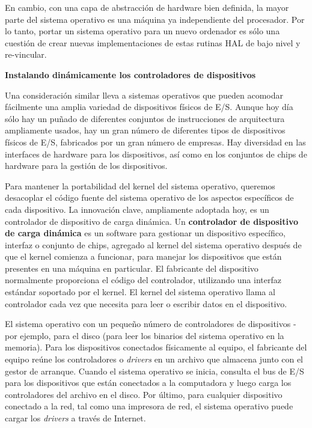 \documentclass[10pt]{book}
\begin{document}
En cambio, con una capa de abstracción de hardware bien definida, la mayor parte del sistema operativo es una máquina ya independiente del procesador. Por lo tanto, portar un sistema operativo para un nuevo ordenador es sólo una cuestión de crear nuevas implementaciones de estas rutinas HAL de bajo nivel y re-vincular.

\textbf{Instalando dinámicamente los controladores de dispositivos}

Una consideración similar lleva a sistemas operativos que pueden acomodar fácilmente una amplia variedad de dispositivos físicos de E/S. Aunque hoy día sólo hay un puñado de diferentes conjuntos de instrucciones de arquitectura ampliamente usados, hay un gran número de diferentes tipos de dispositivos físicos de E/S, fabricados por un gran número de empresas. Hay diversidad en las interfaces de hardware para los dispositivos, así como en los conjuntos de chips de hardware para la gestión de los dispositivos.

Para mantener la portabilidad del kernel del sistema operativo, queremos desacoplar el código fuente del sistema operativo de los aspectos específicos de cada dispositivo. La innovación clave, ampliamente adoptada hoy, es un controlador de dispositivo de carga dinámica. Un \textbf{controlador de dispositivo de carga dinámica} es un software para gestionar un dispositivo específico, interfaz o conjunto de chips, agregado al kernel del sistema operativo después de que el kernel comienza a funcionar, para manejar los dispositivos que están presentes en una máquina en particular. El fabricante del dispositivo normalmente proporciona el código del controlador, utilizando una interfaz estándar soportado por el kernel. El kernel del sistema operativo llama al controlador cada vez que necesita para leer o escribir datos en el dispositivo.

El sistema operativo con un pequeño número de controladores de dispositivos - por ejemplo, para el disco (para leer los binarios del sistema operativo en la memoria). Para los dispositivos conectados físicamente al equipo, el fabricante del equipo reúne los controladores o \textit{drivers} en un archivo que almacena junto con el gestor de arranque. Cuando el sistema operativo se inicia, consulta el bus de E/S para los dispositivos que están conectados a la computadora y luego carga los controladores del archivo en el disco. Por último, para cualquier dispositivo conectado a la red, tal como una impresora de red, el sistema operativo puede cargar los \textit{drivers} a través de Internet.
\end{document}

